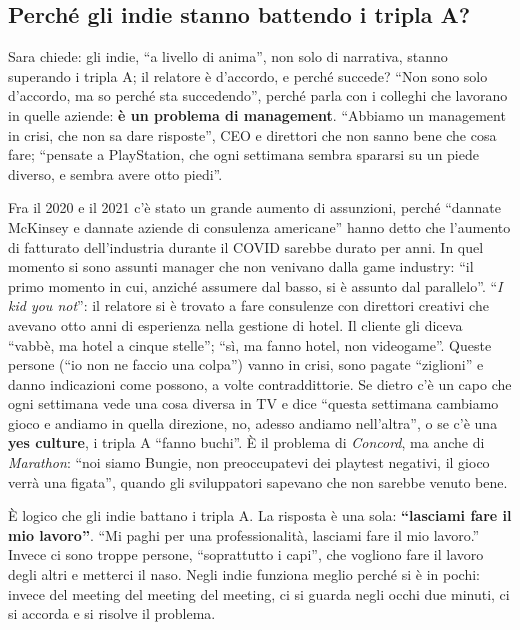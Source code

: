 \subsection{Perché gli indie stanno battendo i tripla A?}

Sara chiede: gli indie, ``a livello di anima'', non solo di narrativa, stanno
superando i tripla A; il relatore è d'accordo, e perché succede? ``Non sono solo
d'accordo, ma so perché sta succedendo'', perché parla con i colleghi che
lavorano in quelle aziende: \textbf{è un problema di management}. ``Abbiamo un
management in crisi, che non sa dare risposte'', CEO e direttori che non sanno
bene che cosa fare; ``pensate a PlayStation, che ogni settimana sembra
spararsi su un piede diverso, e sembra avere otto piedi''.

Fra il 2020 e il 2021 c'è stato un grande aumento di assunzioni, perché
``dannate McKinsey e dannate aziende di consulenza americane'' hanno detto che
l'aumento di fatturato dell'industria durante il COVID sarebbe durato per
anni. In quel momento si sono assunti manager che non venivano dalla game
industry: ``il primo momento in cui, anziché assumere dal basso, si è assunto
dal parallelo''. ``\emph{I kid you not}'': il relatore si è trovato a fare
consulenze con direttori creativi che avevano otto anni di esperienza nella
gestione di hotel. Il cliente gli diceva ``vabbè, ma hotel a cinque stelle'';
``sì, ma fanno hotel, non videogame''. Queste persone (``io non ne faccio una
colpa'') vanno in crisi, sono pagate ``ziglioni'' e danno indicazioni come
possono, a volte contraddittorie. Se dietro c'è un capo che ogni settimana
vede una cosa diversa in TV e dice ``questa settimana cambiamo gioco e andiamo
in quella direzione, no, adesso andiamo nell'altra'', o se c'è una
\textbf{yes culture}, i tripla A ``fanno buchi''. È il problema di
\emph{Concord}, ma anche di \emph{Marathon}: ``noi siamo Bungie, non
preoccupatevi dei playtest negativi, il gioco verrà una figata'', quando gli
sviluppatori sapevano che non sarebbe venuto bene.

È logico che gli indie battano i tripla A. La risposta è una sola:
\textbf{``lasciami fare il mio lavoro''}. ``Mi paghi per una professionalità,
lasciami fare il mio lavoro.'' Invece ci sono troppe persone, ``soprattutto i
capi'', che vogliono fare il lavoro degli altri e metterci il naso. Negli
indie funziona meglio perché si è in pochi: invece del meeting del meeting del
meeting, ci si guarda negli occhi due minuti, ci si accorda e si risolve il
problema.

